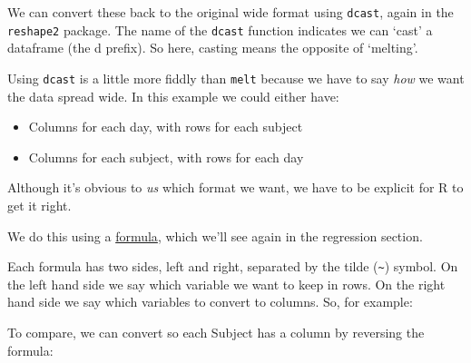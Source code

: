 \documentclass[]{article}
\newenvironment{Shaded}{\begin{snugshade}}{\end{snugshade}}
\newcommand{\KeywordTok}[1]{\textcolor[rgb]{0.13,0.29,0.53}{\textbf{#1}}}
\newcommand{\DecValTok}[1]{\textcolor[rgb]{0.00,0.00,0.81}{#1}}
\newcommand{\StringTok}[1]{\textcolor[rgb]{0.31,0.60,0.02}{#1}}
\newcommand{\CommentTok}[1]{\textcolor[rgb]{0.56,0.35,0.01}{\textit{#1}}}
\newcommand{\OperatorTok}[1]{\textcolor[rgb]{0.81,0.36,0.00}{\textbf{#1}}}
\newcommand{\NormalTok}[1]{#1}
\providecommand{\tightlist}{%
  \setlength{\itemsep}{0pt}\setlength{\parskip}{0pt}}
\theoremstyle{definition}
\theoremstyle{definition}
\theoremstyle{definition}
\theoremstyle{remark}
\begin{document}
We can convert these back to the original wide format using
\texttt{dcast}, again in the \texttt{reshape2} package. The name of the
\texttt{dcast} function indicates we can `cast' a dataframe (the d
prefix). So here, casting means the opposite of `melting'.

Using \texttt{dcast} is a little more fiddly than \texttt{melt} because
we have to say \emph{how} we want the data spread wide. In this example
we could either have:

\begin{itemize}
\tightlist
\item
  Columns for each day, with rows for each subject
\item
  Columns for each subject, with rows for each day
\end{itemize}

Although it's obvious to \emph{us} which format we want, we have to be
explicit for R to get it right.

We do this using a \protect\hyperlink{formulae}{formula}, which we'll
see again in the regression section.

Each formula has two sides, left and right, separated by the tilde
(\texttt{\textasciitilde{}}) symbol. On the left hand side we say which
variable we want to keep in rows. On the right hand side we say which
variables to convert to columns. So, for example:

\begin{Shaded}
\end{Shaded}

To compare, we can convert so each Subject has a column by reversing the
formula:
\end{document}
